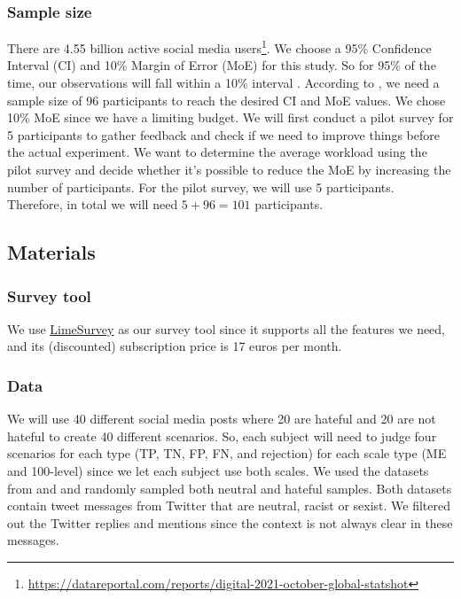 \documentclass[a4paper]{article}
\begin{document}
\subsubsection{Sample size}
There are 4.55 billion active social media users\footnote{\url{https://datareportal.com/reports/digital-2021-october-global-statshot}}. We choose a 95\% Confidence Interval (CI) and 10\% Margin of Error (MoE) for this study. So for 95\% of the time, our observations will fall within a 10\% interval \cite{olson2014ways}. According to \cite{olson2014ways}, we need a sample size of 96 participants to reach the desired CI and MoE values. We chose 10\% MoE since we have a limiting budget. We will first conduct a pilot survey for 5 participants to gather feedback and check if we need to improve things before the actual experiment. We want to determine the average workload using the pilot survey and decide whether it’s possible to reduce the MoE by increasing the number of participants. For the pilot survey, we will use 5 participants. Therefore, in total we will need $5+96 = 101$ participants.

\subsection{Materials}
\subsubsection{Survey tool}
We use \href{https://www.limesurvey.org}{LimeSurvey} as our survey tool since it supports all the features we need, and its (discounted) subscription price is 17 euros per month.

\subsubsection{Data}
We will use 40 different social media posts where 20 are hateful and 20 are not hateful to create 40 different scenarios. So, each subject will need to judge four scenarios for each type (TP, TN, FP, FN, and rejection) for each scale type (ME and 100-level) since we let each subject use both scales. We used the datasets from \cite{waseem2016hateful} and \cite{basile2019semeval} and randomly sampled both neutral and hateful samples. Both datasets contain tweet messages from Twitter that are neutral, racist or sexist. We filtered out the Twitter replies and mentions since the context is not always clear in these messages.
\end{document}
